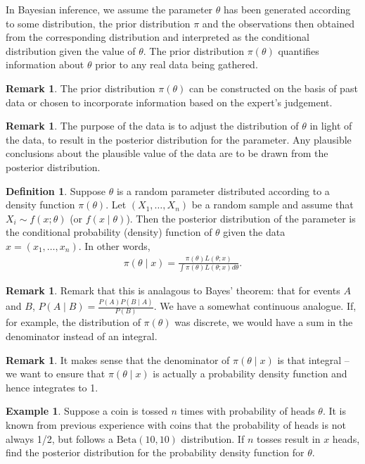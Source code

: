 \documentclass[11pt]{amsart}
\theoremstyle{definition}
\newtheorem{definition}[theorem]{Definition}
\newtheorem{remark}[theorem]{Remark}
\newtheorem{example}[theorem]{Example}
\numberwithin{equation}{section}
\begin{document}
In Bayesian inference, we assume the parameter $\theta$ has been generated according to some distribution, the prior distribution $\pi$ and the observations then obtained from the corresponding distribution and interpreted as the conditional distribution given the value of $\theta$. The prior distribution $\pi(\theta)$ quantifies information about $\theta$ prior to any real data being gathered.
\begin{remark}
    The prior distribution $\pi(\theta)$ can be constructed on the basis of past data or chosen to incorporate information based on the expert's judgement.
\end{remark}
\begin{remark}
    The purpose of the data is to adjust the distribution of $\theta$ in light of the data, to result in the posterior distribution for the parameter. Any plausible conclusions about the plausible value of the data are to be drawn from the posterior distribution.
\end{remark}
\begin{definition}
    Suppose $\theta$ is a random parameter distributed according to a density function $\pi(\theta)$. Let $(X_1,\ldots,X_n)$ be a random sample and assume that $X_i\sim f(x;\theta)$ (or $f(x\mid \theta)$). Then the posterior distribution of the parameter is the conditional probability (density) function of $\theta$ given the data $x=(x_1,\ldots,x_n)$. In other words,
    \begin{align*}
        \pi(\theta\mid x)=\frac{\pi(\theta)L(\theta;x)}{\int \pi(\theta)L(\theta;x)d\theta}.
    \end{align*}
\end{definition}
\begin{remark}
    Remark that this is analagous to Bayes' theorem: that for events $A$ and $B$, $P(A\mid B)=\frac{P(A)P(B\mid A)}{P(B)}$. We have a somewhat continuous analogue. If, for example, the distribution of $\pi(\theta)$ was discrete, we would have a sum in the denominator instead of an integral. 
\end{remark}
\begin{remark}
    It makes sense that the denominator of $\pi(\theta\mid x)$ is that integral --  we want to ensure that $\pi(\theta\mid x)$ is actually a probability density function and hence integrates to 1.
\end{remark}
\begin{example}\label{bayesex1}
    Suppose a coin is tossed $n$ times with probability of heads $\theta$. It is known from previous experience with coins that the probability of heads is not always 1/2, but follows a $\mathrm{Beta}(10,10)$ distribution. If $n$ tosses result in $x$ heads, find the posterior distribution for the probability density function for $\theta$.
\end{example}
\end{document}
